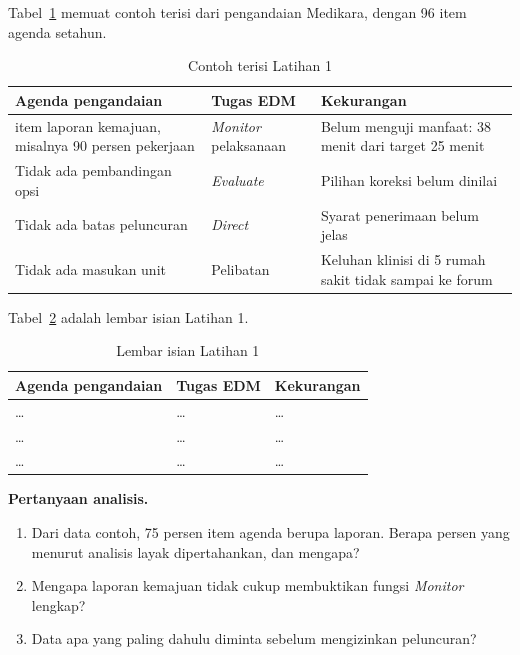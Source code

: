 Tabel~\ref{tab:ch02-lat1-contoh} memuat contoh terisi dari pengandaian Medikara, dengan 96 item agenda
setahun.
\begin{table}[!htb]
  \centering\small
  \caption{Contoh terisi Latihan 1}\label{tab:ch02-lat1-contoh}
  \begin{tabularx}{\textwidth}{|>{\raggedright\arraybackslash}p{}|>{\raggedright\arraybackslash}p{}|>{\raggedright\arraybackslash}X|}
    \hline
    \textbf{Agenda pengandaian} & \textbf{Tugas EDM} & \textbf{Kekurangan} \\ \hline
    72 item laporan kemajuan, misalnya 90 persen pekerjaan & \textit{Monitor} pelaksanaan & Belum menguji
    manfaat: 38 menit dari target 25 menit \\ \hline
    Tidak ada pembandingan opsi & \textit{Evaluate} & Pilihan koreksi belum dinilai \\ \hline
    Tidak ada batas peluncuran & \textit{Direct} & Syarat penerimaan belum jelas \\ \hline
    Tidak ada masukan unit & Pelibatan & Keluhan klinisi di 5 rumah sakit tidak sampai ke forum \\ \hline
  \end{tabularx}
\end{table}

Tabel~\ref{tab:ch02-lat1-hasil} adalah lembar isian Latihan 1.
\begin{table}[!htb]
  \centering\small
  \caption{Lembar isian Latihan 1}\label{tab:ch02-lat1-hasil}
  \begin{tabularx}{\textwidth}{|>{\raggedright\arraybackslash}p{}|>{\raggedright\arraybackslash}p{}|>{\raggedright\arraybackslash}X|}
    \hline
    \textbf{Agenda pengandaian} & \textbf{Tugas EDM} & \textbf{Kekurangan} \\ \hline
    \dots & \dots & \dots \\ \hline
    \dots & \dots & \dots \\ \hline
    \dots & \dots & \dots \\ \hline
  \end{tabularx}
\end{table}

\textbf{Pertanyaan analisis.}
\begin{enumerate}
  \item Dari data contoh, 75 persen item agenda berupa laporan. Berapa persen yang menurut analisis
  layak dipertahankan, dan mengapa?
  \item Mengapa laporan kemajuan tidak cukup membuktikan fungsi \textit{Monitor} lengkap?
  \item Data apa yang paling dahulu diminta sebelum mengizinkan peluncuran?
\end{enumerate}

